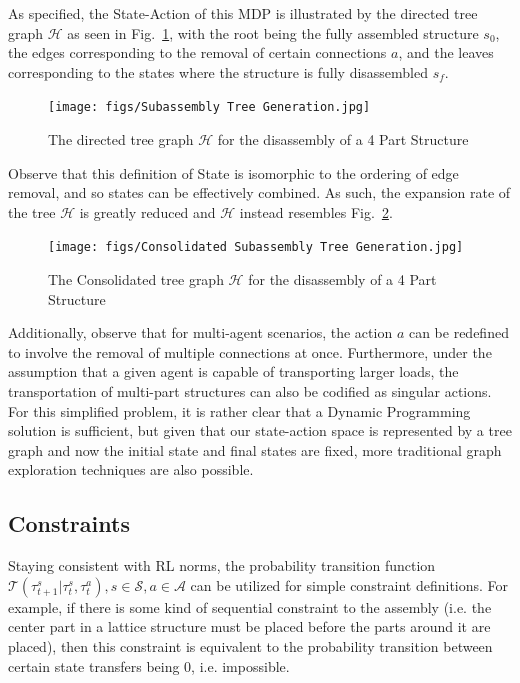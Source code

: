 \documentclass{article}
\begin{document}
As specified, the State-Action of this MDP is illustrated by the directed tree graph $\mathcal{H}$ as seen in Fig.~\ref{fig: treeGen}, with the root being the fully assembled structure $s_0$, the edges corresponding to the removal of certain connections $a$, and the leaves corresponding to the states where the structure is fully disassembled $s_f$.

\begin{figure}[h!]
\centering
\texttt{[image: figs/Subassembly Tree Generation.jpg]}
  \caption{The directed tree graph $\mathcal{H}$ for the disassembly of a 4 Part Structure}
  \label{fig: treeGen}
\end{figure}

Observe that this definition of State is isomorphic to the ordering of edge removal, and so states can be effectively combined. As such, the expansion rate of the tree $\mathcal{H}$ is greatly reduced and $\mathcal{H}$ instead resembles Fig.~\ref{fig: treeGen2}.

\begin{figure}[!h]
\centering
\texttt{[image: figs/Consolidated Subassembly Tree Generation.jpg]}
  \caption{The Consolidated tree graph  $\mathcal{H}$ for the disassembly of a 4 Part Structure}
  \label{fig: treeGen2}
\end{figure}

Additionally, observe that for multi-agent scenarios, the action $a$ can be redefined to involve the removal of multiple connections at once. Furthermore, under the assumption that a given agent is capable of transporting larger loads, the transportation of multi-part structures can also be codified as singular actions. For this simplified problem, it is rather clear that a Dynamic Programming solution is sufficient, but given that our state-action space is represented by a tree graph and now the initial state and final states are fixed, more traditional graph exploration techniques are also possible.


\subsection{Constraints}
Staying consistent with RL norms, the probability transition function $\mathcal{T}(\tau^{s}_{t+1}|\tau^s_t,\tau^a_t), s\in\mathcal{S}, a\in\mathcal{A}$ can be utilized for simple constraint definitions. For example, if there is some kind of sequential constraint to the assembly (i.e. the center part in a lattice structure must be placed before the parts around it are placed), then this constraint is equivalent to the probability transition between certain state transfers being 0, i.e. impossible.
\end{document}
